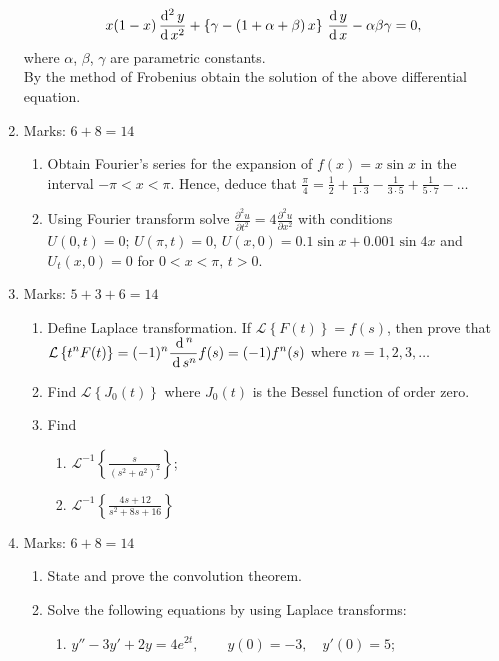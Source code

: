 \documentclass[../main-sheet.tex]{subfiles}
\newcommand{\lap}[1]{\mathcal{L}\left\{ #1\right\}}
\newcommand{\ilap}[1]{\mathcal{L}^{-1}\left\{ #1\right\}}
\begin{document}
\begin{enumerate}
    \[
        x(1-x)\,\frac{\mathrm{d}^{2}\, y}{\mathrm{d}\, x^{2}}+\left\{ \gamma-\left( 1+\alpha+\beta \right)x \right\}\,\frac{\mathrm{d}\,y}{\mathrm{d}\,x}-\alpha\beta\gamma=0,
    \]
    where $ \alpha $, $ \beta $, $ \gamma $ are parametric constants.\\
    By the method of Frobenius obtain the solution of the above differential equation.
    \item Marks: $ 6+8=14 $
    \begin{enumerate}
        \item Obtain Fourier's series for the expansion of $ f(x)=x\sin x $ in the interval $ -\pi<x<\pi $. Hence, deduce that $ \displaystyle\frac{\pi}{4}=\frac{1}{2}+\frac{1}{1\cdot3}-\frac{1}{3\cdot5}+\frac{1}{5\cdot7}-\dots $
        \item Using Fourier transform solve $ \displaystyle \frac{\partial^2 u}{\partial t^2}=4\frac{\partial^2 u}{\partial x^2} $ with conditions\\
        $ U(0,t)=0 $; $ U(\pi,t)=0 $, $ U(x,0)=0.1\sin x+0.001\sin 4x $ and $ U_t(x,0)=0 $ for $ 0<x<\pi,\,t>0 $.
    \end{enumerate}
    \item Marks: $ 5+3+6=14 $
    \begin{enumerate}
        \item Define Laplace transformation. If $ \lap{F(t)}=f(s) $, then prove that\\ $ \displaystyle\lap{t^nF(t)}=(-1)^n\frac{\D^n}{\D s^n}f(s)=(-1)f^n(s) $ where $ n=1,2,3,\dots $
        \item Find $ \lap{J_0(t)} $ where $ J_0(t) $ is the Bessel function of order zero.
        \item Find \begin{enumerate}
            \item $ \displaystyle\ilap{\frac{s}{(s^2+a^2)^2}} $;
            \item $ \displaystyle\ilap{\frac{4s+12}{s^2+8s+16}} $
        \end{enumerate}
    \end{enumerate}
    \item Marks: $ 6+8=14 $
    \begin{enumerate}
        \item State and prove the convolution theorem.
        \item Solve the following equations by using Laplace transforms:
        \begin{enumerate}
            \item $ y''-3y'+2y=4e^{2t},\qquad y(0)=-3,\quad y'(0)=5 $;

\end{enumerate}
\end{enumerate}
\end{enumerate}
\end{document}
